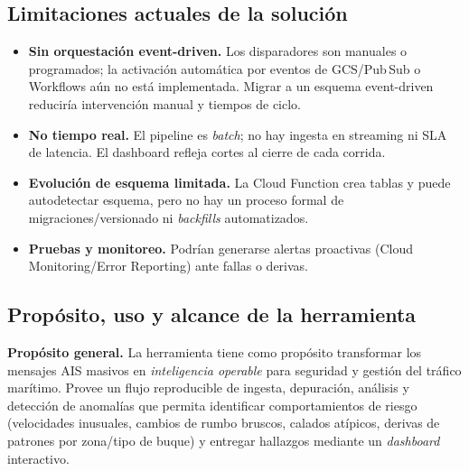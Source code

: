 \documentclass[10pt]{article}
\begin{document}
\subsection{Limitaciones actuales de la solución}
\label{subsec:limitaciones-solucion}

\begin{itemize}
  \item \textbf{Sin orquestación event-driven.} Los disparadores son manuales o programados; la activación automática por eventos de GCS/Pub\,\/Sub o Workflows aún no está implementada. Migrar a un esquema event-driven reduciría intervención manual y tiempos de ciclo.
  \item \textbf{No tiempo real.} El pipeline es \textit{batch}; no hay ingesta en streaming ni SLA de latencia. El dashboard refleja cortes al cierre de cada corrida.
  \item \textbf{Evolución de esquema limitada.} La Cloud Function crea tablas y puede autodetectar esquema, pero no hay un proceso formal de migraciones/versionado ni \textit{backfills} automatizados.
  \item \textbf{Pruebas y monitoreo.} Podrían generarse alertas proactivas (Cloud Monitoring/Error Reporting) ante fallas o derivas.
\end{itemize}

\subsection{Propósito, uso y alcance de la herramienta}
\noindent\textbf{Propósito general.} La herramienta tiene como propósito transformar los mensajes AIS masivos en \textit{inteligencia operable} para seguridad y gestión del tráfico marítimo. Provee un flujo reproducible de ingesta, depuración, análisis y detección de anomalías que permita identificar comportamientos de riesgo (velocidades inusuales, cambios de rumbo bruscos, calados atípicos, derivas de patrones por zona/tipo de buque) y entregar hallazgos mediante un \textit{dashboard} interactivo.
\end{document}

